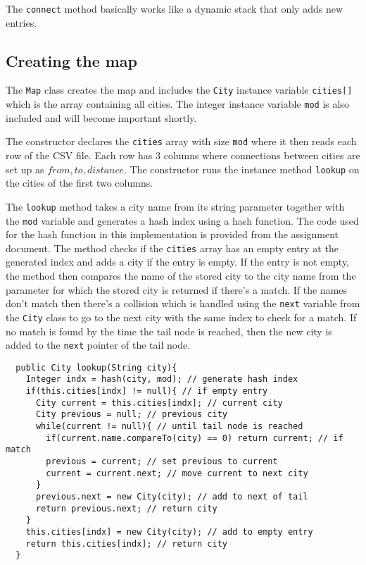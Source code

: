 \documentclass[a4paper,11pt]{article}
\begin{document}
The {\tt connect} method basically works like a dynamic stack that
only adds new entries. 

\subsection*{Creating the map}

The {\tt Map} class creates the map and includes the {\tt City} instance 
variable {\tt cities[]} which is the array containing all cities. The 
integer instance variable {\tt mod} is also included and will become 
important shortly.

The constructor declares the {\tt cities} array with size {\tt mod} where 
it then reads each row of the CSV file. Each row has 3 columns where 
connections between cities are set up as $from,to,distance$. The 
constructor runs the instance method {\tt lookup} on the cities of the 
first two columns. 

The {\tt lookup} method takes a city name from its string parameter 
together with the {\tt mod} variable and generates a hash index using a 
hash function. The code used for the hash function in this implementation 
is provided from the assignment document. The method checks if the 
{\tt cities} array has an empty entry at the generated index and adds a 
city if the entry is empty. If the entry is not empty, the method then
compares the name of the stored city to the city name from the parameter 
for which the stored city is returned if there's a match. If the names 
don't match then there's a collision which is handled using the {\tt next} 
variable from the {\tt City} class to go to the next city with the same 
index to check for a match. If no match is found by the time the tail node
is reached, then the new city is added to the {\tt next} pointer of the 
tail node.

\begin{verbatim}
  public City lookup(String city){
    Integer indx = hash(city, mod); // generate hash index
    if(this.cities[indx] != null){ // if empty entry
      City current = this.cities[indx]; // current city
      City previous = null; // previous city
      while(current != null){ // until tail node is reached
        if(current.name.compareTo(city) == 0) return current; // if match
        previous = current; // set previous to current
        current = current.next; // move current to next city
      }
      previous.next = new City(city); // add to next of tail 
      return previous.next; // return city
    }
    this.cities[indx] = new City(city); // add to empty entry
    return this.cities[indx]; // return city
  }
\end{verbatim}
\end{document}
